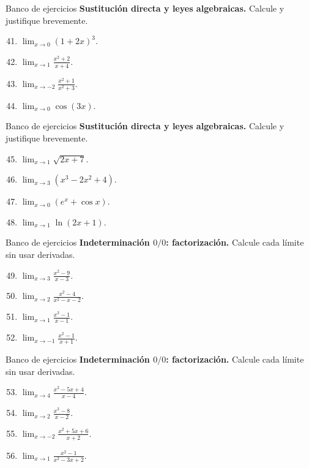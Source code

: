 \documentclass[12pt,aspectratio=169]{beamer}
\begin{document}
\begin{frame}[t,allowframebreaks]{Banco de ejercicios}
\small
\noindent \textbf{Sustitución directa y leyes algebraicas.} Calcule y justifique brevemente.\par\smallskip
\begin{enumerate}\setcounter{enumi}{40}
\item $\displaystyle\lim_{x\to0}(1+2x)^3$.
\item $\displaystyle\lim_{x\to1}\frac{x^2+2}{x+4}$.
\item $\displaystyle\lim_{x\to-2}\frac{x^2+1}{x^2+3}$.
\item $\displaystyle\lim_{x\to0}\cos(3x)$.
\end{enumerate}
\end{frame}


\begin{frame}[t,allowframebreaks]{Banco de ejercicios}
\small
\noindent \textbf{Sustitución directa y leyes algebraicas.} Calcule y justifique brevemente.\par\smallskip
\begin{enumerate}\setcounter{enumi}{44}
\item $\displaystyle\lim_{x\to1}\sqrt{2x+7}$.
\item $\displaystyle\lim_{x\to3}(x^3-2x^2+4)$.
\item $\displaystyle\lim_{x\to0}(e^x+\cos x)$.
\item $\displaystyle\lim_{x\to1}\ln(2x+1)$.
\end{enumerate}
\end{frame}


\begin{frame}[t,allowframebreaks]{Banco de ejercicios}
\small
\noindent \textbf{Indeterminación $0/0$: factorización.} Calcule cada límite sin usar derivadas.\par\smallskip
\begin{enumerate}\setcounter{enumi}{48}
\item $\displaystyle\lim_{x\to3}\frac{x^2-9}{x-3}$.
\item $\displaystyle\lim_{x\to2}\frac{x^2-4}{x^2-x-2}$.
\item $\displaystyle\lim_{x\to1}\frac{x^3-1}{x-1}$.
\item $\displaystyle\lim_{x\to-1}\frac{x^2-1}{x+1}$.
\end{enumerate}
\end{frame}


\begin{frame}[t,allowframebreaks]{Banco de ejercicios}
\small
\noindent \textbf{Indeterminación $0/0$: factorización.} Calcule cada límite sin usar derivadas.\par\smallskip
\begin{enumerate}\setcounter{enumi}{52}
\item $\displaystyle\lim_{x\to4}\frac{x^2-5x+4}{x-4}$.
\item $\displaystyle\lim_{x\to2}\frac{x^3-8}{x-2}$.
\item $\displaystyle\lim_{x\to-2}\frac{x^2+5x+6}{x+2}$.
\item $\displaystyle\lim_{x\to1}\frac{x^2-1}{x^2-3x+2}$.
\end{enumerate}
\end{frame}
\end{document}

